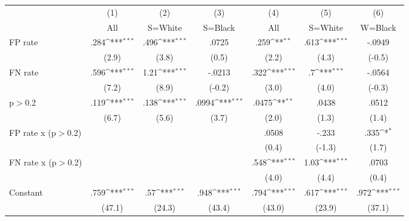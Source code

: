 \begin{table}[htbp]\centering
\def\sym#1{\ifmmode^{#1}\else\(^{#1}\)\fi}
\begin{tabular}{l*{6}{c}}
\hline\hline
                &\multicolumn{1}{c}{(1)}&\multicolumn{1}{c}{(2)}&\multicolumn{1}{c}{(3)}&\multicolumn{1}{c}{(4)}&\multicolumn{1}{c}{(5)}&\multicolumn{1}{c}{(6)}\\
                &\multicolumn{1}{c}{All}&\multicolumn{1}{c}{S=White}&\multicolumn{1}{c}{S=Black}&\multicolumn{1}{c}{All}&\multicolumn{1}{c}{S=White}&\multicolumn{1}{c}{W=Black}\\
\hline
FP rate         &     .284\sym{***}&     .496\sym{***}&    .0725         &     .259\sym{**} &     .613\sym{***}&   -.0949         \\
                &    (2.9)         &    (3.8)         &    (0.5)         &    (2.2)         &    (4.3)         &   (-0.5)         \\
FN rate         &     .596\sym{***}&     1.21\sym{***}&   -.0213         &     .322\sym{***}&       .7\sym{***}&   -.0564         \\
                &    (7.2)         &    (8.9)         &   (-0.2)         &    (3.0)         &    (4.0)         &   (-0.3)         \\
p$>$0.2         &     .119\sym{***}&     .138\sym{***}&    .0994\sym{***}&    .0475\sym{**} &    .0438         &    .0512         \\
                &    (6.7)         &    (5.6)         &    (3.7)         &    (2.0)         &    (1.3)         &    (1.4)         \\
FP rate x (p$>$0.2)&                  &                  &                  &    .0508         &    -.233         &     .335\sym{*}  \\
                &                  &                  &                  &    (0.4)         &   (-1.3)         &    (1.7)         \\
FN rate x (p$>$0.2)&                  &                  &                  &     .548\sym{***}&     1.03\sym{***}&    .0703         \\
                &                  &                  &                  &    (4.0)         &    (4.4)         &    (0.4)         \\
Constant        &     .759\sym{***}&      .57\sym{***}&     .948\sym{***}&     .794\sym{***}&     .617\sym{***}&     .972\sym{***}\\
                &   (47.1)         &   (24.3)         &   (43.4)         &   (43.0)         &   (23.9)         &   (37.1)         \\

\end{tabular}
\end{table}
